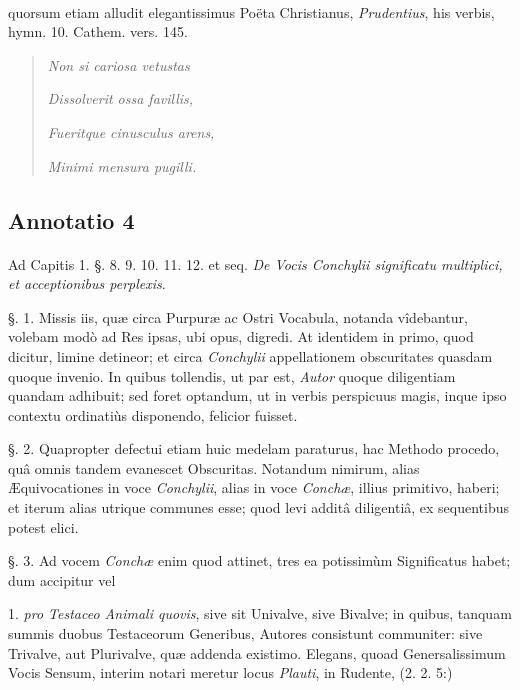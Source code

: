 \documentclass[a4paper, 11pt, oneside, polutonikogreek, german]{article}
\begin{document}
\paragraph{}
quorsum etiam alludit elegantissimus Poëta Christianus, \emph{Prudentius}, his verbis, hymn. 10. Cathem. vers. 145.
\begin{quotation}
\emph{Non si cariosa vetustas}

\emph{Dissolverit ossa favillis,}

\emph{Fueritque cinusculus arens,}

\emph{Minimi mensura pugilli.}
\end{quotation}
\paragraph{}
\subsection{Annotatio 4}
\paragraph{}
Ad Capitis 1. §. 8. 9. 10. 11. 12. et seq. \emph{De Vocis Conchylii significatu multiplici, et acceptionibus perplexis}.

§. 1. Missis iis, quæ circa Purpuræ ac Ostri Vocabula, notanda vîdebantur, volebam modò ad Res ipsas, ubi opus, digredi. At identidem in primo, quod dicitur, limine detineor; et circa \emph{Conchylii} appellationem obscuritates quasdam quoque invenio. In quibus tollendis, ut par est, \emph{Autor} quoque diligentiam quandam adhibuit; sed foret optandum, ut in verbis perspicuus magis, inque ipso contextu ordinatiùs disponendo, felicior fuisset.

§. 2. Quapropter defectui etiam huic medelam paraturus, hac Methodo procedo, quâ omnis tandem evanescet Obscuritas. Notandum nimirum, alias Æquivocationes in voce \emph{Conchylii}, alias in voce \emph{Conchæ}, illius primitivo, haberi; et iterum alias utrique communes esse; quod levi additâ diligentiâ, ex sequentibus potest elici.

§. 3. Ad vocem \emph{Conchæ} enim quod attinet, tres ea potissimùm Significatus habet; dum accipitur vel

1. \emph{pro Testaceo Animali quovis}, sive sit Univalve, sive Bivalve; in quibus, tanquam summis duobus Testaceorum Generibus, Autores consistunt communiter: sive Trivalve, aut Plurivalve, quæ addenda existimo. Elegans, quoad Genersalissimum Vocis Sensum, interim notari meretur locus \emph{Plauti}, in Rudente, (2. 2. 5:)
\end{document}
